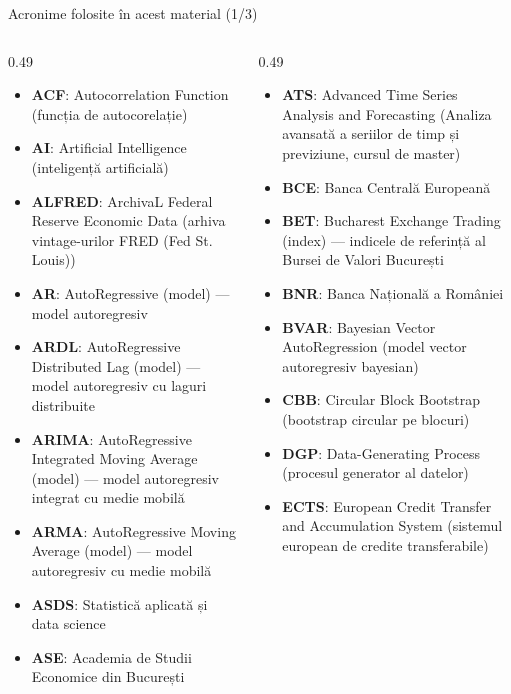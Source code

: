 {
\begin{frame}[noframenumbering]
    \titlepage
\end{frame}
}
\begin{frame}{Acronime folosite în acest material (1/3)}
\begin{columns}[T]
\begin{column}{0.49\textwidth}
\begin{itemize}\setlength{\itemsep}{0pt}
    \item \textbf{ACF}: Autocorrelation Function (funcția de autocorelație)
    \item \textbf{AI}: Artificial Intelligence (inteligență artificială)
    \item \textbf{ALFRED}: ArchivaL Federal Reserve Economic Data (arhiva vintage-urilor FRED (Fed St. Louis))
    \item \textbf{AR}: AutoRegressive (model) — model autoregresiv
    \item \textbf{ARDL}: AutoRegressive Distributed Lag (model) — model autoregresiv cu laguri distribuite
    \item \textbf{ARIMA}: AutoRegressive Integrated Moving Average (model) — model autoregresiv integrat cu medie mobilă
    \item \textbf{ARMA}: AutoRegressive Moving Average (model) — model autoregresiv cu medie mobilă
    \item \textbf{ASDS}: Statistică aplicată și data science
    \item \textbf{ASE}: Academia de Studii Economice din București
\end{itemize}
\end{column}
\begin{column}{0.49\textwidth}
\begin{itemize}\setlength{\itemsep}{0pt}
    \item \textbf{ATS}: Advanced Time Series Analysis and Forecasting (Analiza avansată a seriilor de timp și previziune, cursul de master)
    \item \textbf{BCE}: Banca Centrală Europeană
    \item \textbf{BET}: Bucharest Exchange Trading (index) — indicele de referință al Bursei de Valori București
    \item \textbf{BNR}: Banca Națională a României
    \item \textbf{BVAR}: Bayesian Vector AutoRegression (model vector autoregresiv bayesian)
    \item \textbf{CBB}: Circular Block Bootstrap (bootstrap circular pe blocuri)
    \item \textbf{DGP}: Data-Generating Process (procesul generator al datelor)
    \item \textbf{ECTS}: European Credit Transfer and Accumulation System (sistemul european de credite transferabile)
\end{itemize}
\end{column}
\end{columns}
\end{frame}
